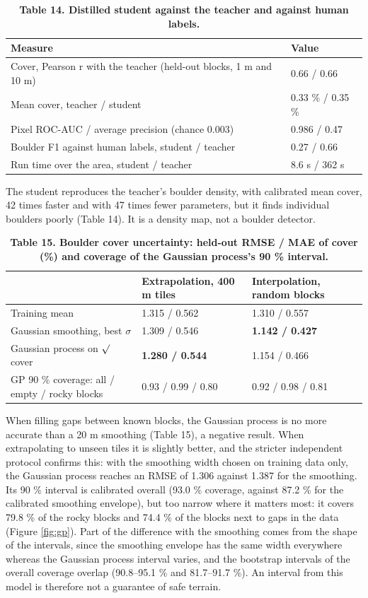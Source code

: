 \documentclass[11pt,a4paper]{article}
\begin{document}
\begin{table}[H]
\centering\small
\caption{\textbf{Table 14. Distilled student against the teacher and against human labels.}}
\begin{tabular}{ll}
\toprule
Measure & Value \\
\midrule
Cover, Pearson r with the teacher (held-out blocks, 1 m and 10 m) & 0.66 / 0.66 \\
Mean cover, teacher / student & 0.33 \% / 0.35 \% \\
Pixel ROC-AUC / average precision (chance 0.003) & 0.986 / 0.47 \\
Boulder F1 against human labels, student / teacher & 0.27 / 0.66 \\
Run time over the area, student / teacher & 8.6 s / 362 s \\
\bottomrule
\end{tabular}
\end{table}

The student reproduces the teacher's boulder density, with calibrated mean cover, 42 times faster and with 47 times fewer parameters, but it finds individual boulders poorly (Table 14). It is a density map, not a boulder detector.

\begin{table}[H]
\centering\small
\caption{\textbf{Table 15. Boulder cover uncertainty: held-out RMSE / MAE of cover (\%) and coverage of the Gaussian process's 90 \% interval.}}
\begin{tabular}{lll}
\toprule
 & Extrapolation, 400 m tiles & Interpolation, random blocks \\
\midrule
Training mean & 1.315 / 0.562 & 1.310 / 0.557 \\
Gaussian smoothing, best $\sigma$ & 1.309 / 0.546 & \textbf{1.142 / 0.427} \\
Gaussian process on $\surd$cover & \textbf{1.280 / 0.544} & 1.154 / 0.466 \\
GP 90 \% coverage: all / empty / rocky blocks & 0.93 / 0.99 / 0.80 & 0.92 / 0.98 / 0.81 \\
\bottomrule
\end{tabular}
\end{table}

When filling gaps between known blocks, the Gaussian process is no more accurate than a 20 m smoothing (Table 15), a negative result. When extrapolating to unseen tiles it is slightly better, and the stricter independent protocol confirms this: with the smoothing width chosen on training data only, the Gaussian process reaches an RMSE of 1.306 against 1.387 for the smoothing. Its 90 \% interval is calibrated overall (93.0 \% coverage, against 87.2 \% for the calibrated smoothing envelope), but too narrow where it matters most: it covers 79.8 \% of the rocky blocks and 74.4 \% of the blocks next to gaps in the data (Figure \ref{fig:gp}). Part of the difference with the smoothing comes from the shape of the intervals, since the smoothing envelope has the same width everywhere whereas the Gaussian process interval varies, and the bootstrap intervals of the overall coverage overlap (90.8--95.1 \% and 81.7--91.7 \%). An interval from this model is therefore not a guarantee of safe terrain.
\end{document}
